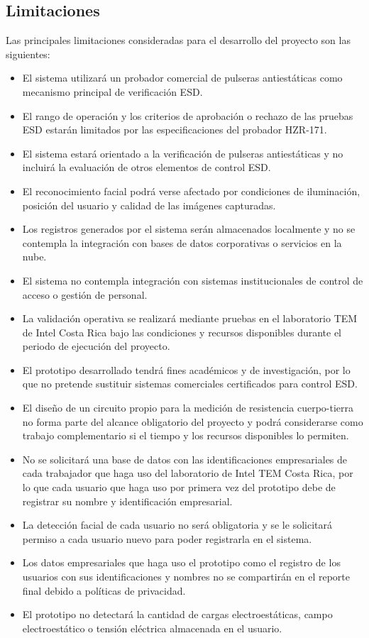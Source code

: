 \subsection{Limitaciones}

Las principales limitaciones consideradas para el desarrollo del proyecto son las siguientes:

\begin{itemize}
\item El sistema utilizará un probador comercial de pulseras antiestáticas como mecanismo principal de verificación ESD.
\item El rango de operación y los criterios de aprobación o rechazo de las pruebas ESD estarán limitados por las especificaciones del probador HZR-171.
\item El sistema estará orientado a la verificación de pulseras antiestáticas y no incluirá la evaluación de otros elementos de control ESD.
\item El reconocimiento facial podrá verse afectado por condiciones de iluminación, posición del usuario y calidad de las imágenes capturadas.
\item Los registros generados por el sistema serán almacenados localmente y no se contempla la integración con bases de datos corporativas o servicios en la nube.
\item El sistema no contempla integración con sistemas institucionales de control de acceso o gestión de personal.
\item La validación operativa se realizará mediante pruebas en el laboratorio TEM de Intel Costa Rica bajo las condiciones y recursos disponibles durante el periodo de ejecución del proyecto.
\item El prototipo desarrollado tendrá fines académicos y de investigación, por lo que no pretende sustituir sistemas comerciales certificados para control ESD.
\item El diseño de un circuito propio para la medición de resistencia cuerpo-tierra no forma parte del alcance obligatorio del proyecto y podrá considerarse como trabajo complementario si el tiempo y los recursos disponibles lo permiten.
\item No se solicitará una base de datos con las identificaciones empresariales de cada trabajador que haga uso del laboratorio de Intel TEM Costa Rica, por lo que cada usuario que haga uso por primera vez del prototipo debe de registrar su nombre y identificación empresarial.
\item La detección facial de cada usuario no será obligatoria y se le solicitará permiso a cada usuario nuevo para poder registrarla en el sistema.
\item Los datos empresariales que haga uso el prototipo como el registro de los usuarios con sus identificaciones y nombres no se compartirán en el reporte final debido a políticas de privacidad.
\item El prototipo no detectará la cantidad de cargas electroestáticas, campo electroestático o tensión eléctrica almacenada en el usuario.
\end{itemize}


